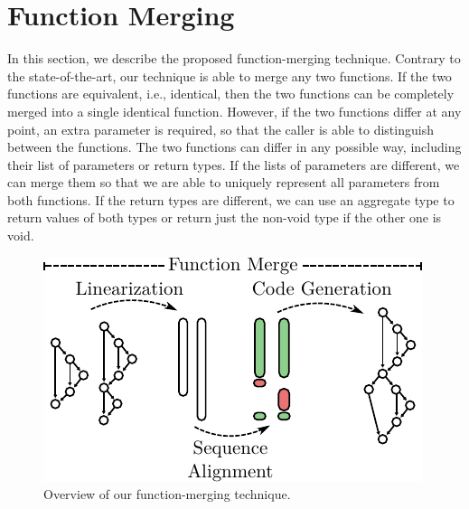 \section{Function Merging} \label{sec:fm}

In this section, we describe the proposed function-merging technique.
Contrary to the state-of-the-art, our technique is able to merge any two
functions.
If the two functions are equivalent, i.e., identical, then the two functions
can be completely merged into a single identical function.
However, if the two functions differ at any point, an extra parameter is
required, so that the caller is able to distinguish between the functions. 
The two functions can differ in any possible way, including their list of
parameters or return types.
If the lists of parameters are different, we can merge them so that we are able
to uniquely represent all parameters from both functions.
If the return types are different, we can use an aggregate type to return values
of both types or return just the non-void type if the other one is void.

\begin{figure}[h]
  \centering
  \includegraphics[width=0.85\linewidth]{figs/func-merge-overview.pdf}
  \caption{Overview of our function-merging technique.}
  \label{fig:func-merge-overview}
\end{figure}

